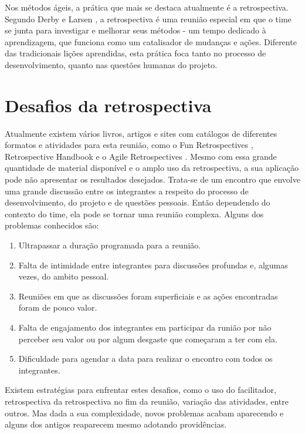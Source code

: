 \documentclass[12pt]{article}
\begin{document}
Nos métodos ágeis, a prática que mais se destaca atualmente é a retrospectiva. Segundo Derby e Larsen \cite{retrospectives:06}, a retrospectiva é uma reunião especial em que o time se junta para investigar e melhorar seus métodos - um tempo dedicado à aprendizagem, que funciona como um catalisador de mudanças e ações. Diferente das tradicionais lições aprendidas, esta prática foca tanto no processo de desenvolvimento, quanto nas questões humanas do projeto.

\section{Desafios da retrospectiva}

Atualmente existem vários livros, artigos e sites com catálogos de diferentes formatos e atividades para esta reunião, como o Fun Retrospectives \cite{fun:14}, Retrospective Handbook \cite{handbook:13} e o Agile Retrospectives \cite{retrospectives:06}. Mesmo com essa grande quantidade de material disponível e o amplo uso da retrospectiva, a sua aplicação pode não apresentar os resultados desejados. Trata-se de um encontro que envolve uma grande discussão entre os integrantes a respeito do processo de desenvolvimento, do projeto e de questões pessoais. Então dependendo do contexto do time, ela pode se tornar uma reunião complexa. Alguns dos problemas conhecidos são:

\begin{enumerate}
  \item Ultrapassar a duração programada para a reunião.
  \item Falta de intimidade entre integrantes para discussões profundas e, algumas vezes, do ambito pessoal.
  \item Reuniões em que as discussões foram superficiais e as ações encontradas foram de pouco valor.
  \item Falta de engajamento dos integrantes em participar da runião por não perceber seu valor ou por algum desgaste que começaram a ter com ela.
  \item Dificuldade para agendar a data para realizar o encontro com todos os integrantes.
\end{enumerate}

Existem estratégias para enfrentar estes desafios, como o uso do facilitador, retrospectiva da retrospectiva no fim da reunião, variação das atividades, entre outros. Mas dada a sua complexidade, novos problemas acabam aparecendo e alguns dos antigos reaparecem mesmo adotando providências.
\end{document}
